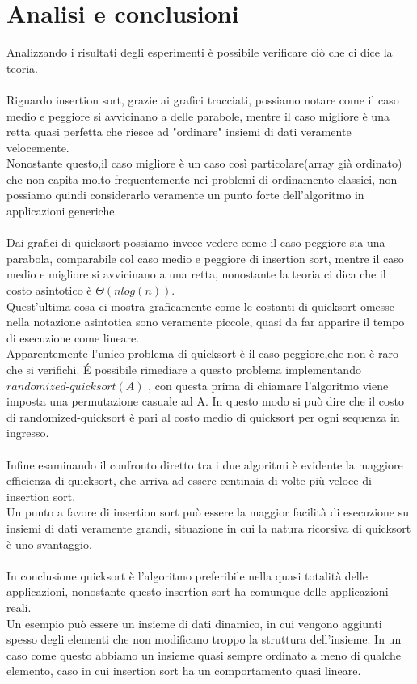 \documentclass[]{article}
\begin{document}
\section{Analisi e conclusioni}
Analizzando i risultati degli esperimenti è possibile verificare ciò che ci dice la teoria.\\\\
Riguardo insertion sort, grazie ai grafici tracciati, possiamo notare come il caso medio e peggiore si avvicinano a delle parabole, mentre il caso migliore è una retta quasi perfetta che riesce ad "ordinare" insiemi di dati veramente velocemente.\\
Nonostante questo,il caso migliore è un caso così particolare(array già ordinato) che non capita molto frequentemente nei problemi di ordinamento classici, non possiamo quindi considerarlo veramente un punto forte dell'algoritmo in applicazioni generiche.\\\\
Dai grafici di quicksort possiamo invece vedere come il caso peggiore sia una parabola, comparabile col caso medio e peggiore di insertion sort, mentre il caso medio e migliore si avvicinano a una retta, nonostante la teoria ci dica che il costo asintotico è $\Theta(nlog(n))$.\\
Quest'ultima cosa ci mostra graficamente come le costanti di quicksort omesse nella notazione asintotica sono veramente piccole, quasi da far apparire il tempo di esecuzione come lineare.\\
Apparentemente l'unico problema di quicksort è il caso peggiore,che non è raro che si verifichi. \'E possibile rimediare a questo problema implementando $randomized\mbox{-}quicksort(A)$ , con questa prima di chiamare l'algoritmo viene imposta una permutazione casuale ad A. In questo modo si può dire che il costo di randomized-quicksort è pari al costo medio di quicksort per ogni sequenza in ingresso.\\\\
Infine esaminando il confronto diretto tra i due algoritmi è evidente la maggiore efficienza di quicksort, che arriva ad essere centinaia di volte più veloce di insertion sort.\\
Un punto a favore di insertion sort può essere la maggior facilità di esecuzione su insiemi di dati veramente grandi, situazione in cui la natura ricorsiva di quicksort è uno svantaggio.\\\\
In conclusione quicksort è l'algoritmo preferibile nella quasi totalità delle applicazioni, nonostante questo insertion sort ha comunque delle applicazioni reali.\\
Un esempio può essere un insieme di dati dinamico, in cui vengono aggiunti spesso degli elementi che non modificano troppo la struttura dell'insieme. In un caso come questo abbiamo un insieme quasi sempre ordinato a meno di qualche elemento, caso in cui insertion sort ha un comportamento quasi lineare.
\end{document}
